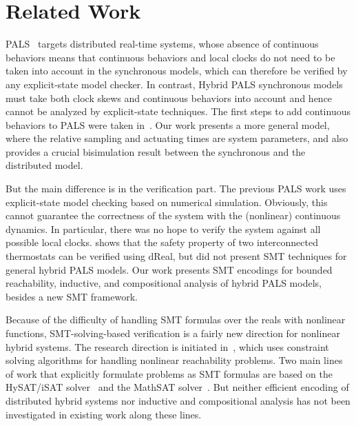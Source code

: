 

\section{Related Work}
\label{sec:related-work}

PALS~\cite{pals-rtss09,mr-pals-journal,pals-tcs,al2012pattern} targets
distributed real-time systems, whose absence of continuous behaviors
means that continuous behaviors and local clocks do not need to be
taken into account in the synchronous models, which can therefore be
verified by any explicit-state model checker. In contrast, Hybrid PALS
synchronous models must take both clock skews and continuous behaviors
into account and hence cannot be analyzed by explicit-state
techniques. The first steps to add continuous behaviors to PALS were
taken in~\cite{hybrid-pals}. Our work presents a more general
model, where the relative sampling and actuating times are system
parameters,  and also provides a crucial bisimulation result between
the 
synchronous and the distributed model. 

But the main difference is in the verification part. 
The previous PALS work uses explicit-state model checking based on numerical simulation.
Obviously, this cannot guarantee the correctness of the system with the (nonlinear) continuous dynamics.
In particular,
there was no hope to verify the system against all possible local clocks.
\cite{hybrid-pals} shows that the safety property of two interconnected thermostats
can be verified using \textsf{dReal}, but did not present SMT techniques for 
general hybrid PALS models.
Our work presents SMT encodings for bounded reachability, inductive, and
compositional analysis of hybrid PALS models,
besides a new SMT framework.

Because of the difficulty of handling SMT
formulas over the reals with nonlinear functions, 
SMT-solving-based verification is a fairly new direction for nonlinear hybrid
systems. The research
direction is initiated in~\cite{ratschan2007safety}, which uses constraint
solving algorithms for handling nonlinear reachability problems. Two
main lines of work that explicitly formulate problems as SMT formulas
are based on the HySAT/iSAT
solver~\cite{DBLP:journals/fmsd/FranzleH07,eggers2008sat}
and the MathSAT
solver~\cite{DBLP:conf/aaai/CimattiMT12,DBLP:conf/fmcad/CimattiMT12}.
But neither efficient encoding of distributed hybrid systems nor 
inductive and compositional analysis has not been
investigated in existing work along these lines. 

